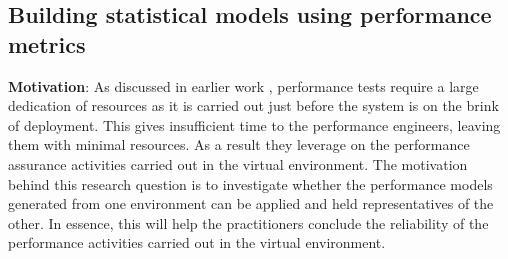\begin{table}[tbh]
	\centering
	\caption{CloudStore: Top 10 highly correlated metrics with load (Virtual Server)}
	\label{my-label}
\end{table}


\subsection{Building statistical models using performance metrics}
\label{sec:model}
\textbf{Motivation}: As discussed in earlier work \cite{Shang:2015:ADP:2668930.2688052} \cite{Nguyen:2012:ADP:2188286.2188344}, performance tests require a large dedication of resources as it is carried out just before the system is on the brink of deployment. This gives insufficient time to the performance engineers, leaving them with minimal resources. As a result they leverage on the performance assurance activities carried out in the virtual environment. The motivation behind this research question is to investigate whether the performance models generated from one environment can be applied and held representatives of the other. In essence, this will help the practitioners conclude the reliability of the performance activities carried out in the virtual environment. 

